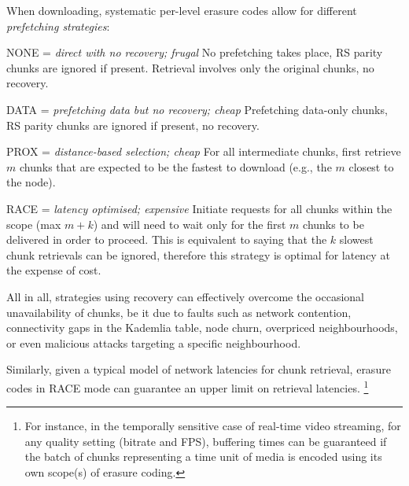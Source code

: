 When downloading, systematic per-level erasure codes allow for different \emph{prefetching strategies}:
\begin{labelledlist}
\item[\textsc{NONE} = \emph{direct with no recovery; frugal}] No prefetching takes place, RS parity chunks are ignored if present. Retrieval involves  only the original chunks, no recovery. 
\item[\textsc{DATA} = \emph{prefetching data but no recovery; cheap}] Prefetching data-only chunks, RS parity chunks are ignored if present, no recovery.
\item[\textsc{PROX} = \emph{distance-based selection; cheap}] For all intermediate chunks, first retrieve $ m$ chunks that are expected to be the fastest to download (e.g., the $m$ closest to the node).
\item[\textsc{RACE} = \emph{latency optimised; expensive}] Initiate requests for all chunks within the scope (max $m+k$) and will need to wait only for the first $m$ chunks to be delivered in order to proceed. This is equivalent to saying that the  $k$ slowest chunk retrievals can be ignored, therefore this strategy is optimal for latency at the expense of cost.
\end{labelledlist}



All in all, strategies using recovery  can effectively overcome the occasional unavailability of chunks, be it due to faults such as network contention, connectivity gaps in the Kademlia table, node churn, overpriced neighbourhoods, or even malicious attacks targeting a specific neighbourhood. 

Similarly, given a typical model of network latencies for chunk retrieval, erasure codes in \textsc{RACE} mode can guarantee an upper limit on retrieval latencies.%
%
\footnote{For instance, in the temporally sensitive case of real-time video streaming, for any quality setting (bitrate and FPS), buffering times can be guaranteed if the batch of chunks representing a time unit of media is encoded using its own scope(s) of erasure coding.}

